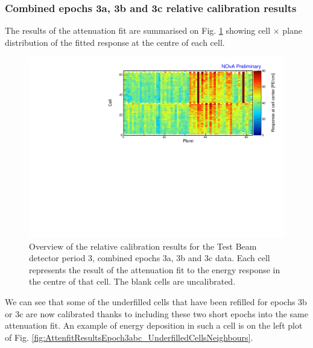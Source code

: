 \subsubsection*{Combined epochs 3a, 3b and 3c relative calibration results}

The results of the attenuation fit are summarised on Fig. \ref{fig:CellCentreResponseEp3abc} showing cell $\times$ plane distribution of the fitted response at the centre of each cell.

\begin{figure}[!hbtp]
\centering
\includegraphics[width=\textwidth]{PlotsTBCalibTechnote/CellResponseAtCentre_epoch3abc_Limited_NOvAPlotStyle.pdf}
\caption{Overview of the relative calibration results for the Test Beam detector period 3, combined epochs 3a, 3b and 3c data. Each cell represents the result of the attenuation fit to the energy response in the centre of that cell. The blank cells are uncalibrated.}
\label{fig:CellCentreResponseEp3abc}
\end{figure}

We can see that some of the underfilled cells that have been refilled for epochs 3b or 3c are now calibrated thanks to including these two short epochs into the same attenuation fit. An example of energy deposition in such a cell is on the left plot of Fig. \ref{fig:AttenfitResultsEpoch3abc_UnderfilledCellsNeighbours}.

